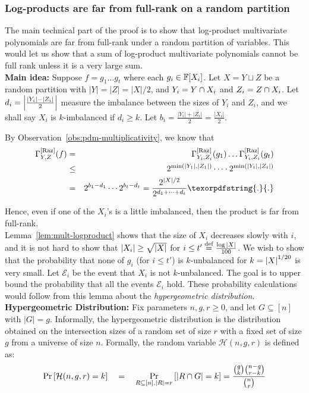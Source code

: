 \documentclass{birkjour}
\newcommand{\CM}[1]{\Gamma^{\mathrm{[#1]}}}
\newcommand{\spaced}[1]{\quad#1\quad}
\providecommand{\DIFaddtex}[1]{{\protect\color{blue}\uwave{#1}}} %
\providecommand{\DIFaddbegin}{} %
\providecommand{\DIFaddend}{} %
\providecommand{\DIFadd}[1]{\texorpdfstring{\DIFaddtex{#1}}{#1}} %
\begin{document}
\subsubsection{Log-products are far from full-rank on a random
  partition}

The main technical part of the proof is to show that log-product multivariate polynomials are far from full-rank under a random partition of variables. This would let us show that a sum of log-product multivariate polynomials cannot be full rank unless it is a very large sum.\\

{\bf Main idea: } Suppose $f = g_1 \dots g_t$ where each $g_i \in \mathbb{F}[X_i]$. Let $X = Y \sqcup Z$ be a random partition with $|Y| = |Z| = |X|/2$, and $Y_i = Y \cap X_i$ and $Z_i = Z \cap X_i$. Let $d_i = \left|\frac{|Y_i| - |Z_i|}{2}\right|$ measure the imbalance between the sizes of $Y_i$ and $Z_i$, and we shall say $X_i$ is $k$-imbalanced if $d_i \geq k$. Let $b_i = \frac{|Y_i| + |Z_i|}{2} = \frac{|X_i|}{2}$.

By Observation~\ref{obs:pdm-multiplicativity}, we know that 
\begin{eqnarray*}
\CM{Raz}_{Y,Z}(f) & = & \CM{Raz}_{Y_i,Z_i}(g_1) \dots \CM{Raz}_{Y_i,Z_i}(g_t)\\
 & \leq & 2^{\min(|Y_1|,|Z_1|)} \cdots  \cdot 2^{\min(|Y_t|,|Z_t|)}\\ 
 & = & 2^{b_1  - d_1} \cdots 2^{b_t - d_t} = \frac{2^{|X|/2}}{2^{d_1 + \dots + d_t}}\DIFaddbegin \DIFadd{.
}\DIFaddend \end{eqnarray*}

Hence, even if one of the $X_i$'s is a little imbalanced, then the product is far from full-rank. \\

Lemma~\ref{lem:mult-logproduct} shows that the size of $X_i$ decreases slowly with $i$, and it is not hard to show that $\left|X_i\right| \geq \sqrt{\left|X\right|}$ for $i \leq t'\stackrel{\text{def}}{=}\frac{\log{\left|X\right|}}{100}$. We wish to show that the probability that none of $g_i$ (for $i\leq t'$) is $k$-unbalanced for $k = \left|X\right|^{1/20}$ is very small. Let $\mathcal{E}_i$ be the event that $X_i$ is not $k$-unbalanced. The goal is to upper bound the probability that all the events $\mathcal{E}_i$ hold. These probability calculations would follow from this lemma about the \emph{hypergeometric distribution}.\\

{\bf Hypergeometric Distribution: } Fix parameters $n, g, r \geq 0$, and let $G \subseteq [n]$ with $|G| = g$. Informally, the hypergeometric distribution is the distribution obtained on the intersection sizes of a random set of size $r$ with a fixed set of size $g$ from a universe of size $n$. 
Formally, the random variable $\mathcal{H}(n,g,r)$ is defined as:
$$
\Pr\insquare{\mathcal{H}(n,g,r) = k} \spaced{=} \Pr_{R\subseteq [n],|R| = r}\insquare{\abs{R \intersection G} = k} = \frac{\binom{g}{k}\binom{n-g}{r-k}}{\binom{n}{r}}
$$
\end{document}
